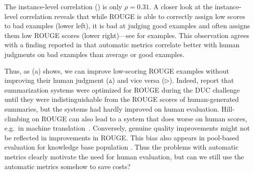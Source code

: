 The instance-level correlation () is only $\rho = 0.31$.
A closer look at the instance-level correlation reveals that
while ROUGE is able to correctly assign low scores to bad examples (lower left),
it is bad at judging good examples and often assigns them low ROUGE scores (lower right)---see  for examples.
This observation agrees with a finding reported in \citet{novikova2017why} that automatic metrics correlate better with human judgments on bad examples than average or good examples. 


Thus, as (a) shows, we can improve low-scoring ROUGE examples without improving their human judgment ($\vartriangle$) and vice versa ($\triangleright$).
Indeed, \citet{conroy2008mind} report that summarization systems were optimized for ROUGE during the DUC challenge~\citep{dang2006overview}
until they were indistinguishable from the ROUGE scores of human-generated summaries, but the systems had hardly improved on human evaluation.
Hill-climbing on ROUGE can also lead to a system that does worse on human scores, e.g.\ in machine translation~\citep{wu2016google}.
Conversely, genuine quality improvements might not be reflected in improvements in ROUGE\@.
This bias also appears in pool-based evaluation for knowledge base population \citep{chaganty2017unbiased}.
Thus the problems with automatic metrics clearly motivate the need for human evaluation,
but can we still use the automatic metrics somehow to save costs?


